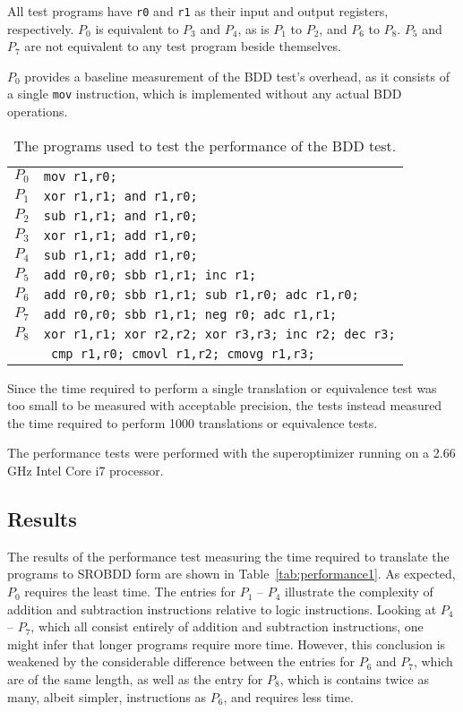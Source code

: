 \documentclass[a4paper,11pt]{kth-mag}
\begin{document}
All test programs have \verb|r0| and \verb|r1| as their input and output registers, respectively.
$P_0$ is equivalent to $P_3$ and $P_4$, as is $P_1$ to $P_2$, and $P_6$ to $P_8$.
$P_5$ and $P_7$ are not equivalent to any test program beside themselves.

$P_0$ provides a baseline measurement of the BDD test's overhead, as it consists of a single \verb|mov| instruction, which is implemented without any actual BDD operations.

\begin{table}
\centering
\begin{tabular}{l|l}
$P_0$ & \verb|mov r1,r0;| \\
$P_1$ & \verb|xor r1,r1; and r1,r0;| \\
$P_2$ & \verb|sub r1,r1; and r1,r0;| \\
$P_3$ & \verb|xor r1,r1; add r1,r0;| \\
$P_4$ & \verb|sub r1,r1; add r1,r0;| \\
$P_5$ & \verb|add r0,r0; sbb r1,r1; inc r1;| \\
$P_6$ & \verb|add r0,r0; sbb r1,r1; sub r1,r0; adc r1,r0;| \\
$P_7$ & \verb|add r0,r0; sbb r1,r1; neg r0; adc r1,r1;| \\
$P_8$ & \verb|xor r1,r1; xor r2,r2; xor r3,r3; inc r2; dec r3;|\\
      & \verb| cmp r1,r0; cmovl r1,r2; cmovg r1,r3;| \\
\end{tabular}
\caption{The programs used to test the performance of the BDD test.}
\label{tab:test_programs}
\end{table}

Since the time required to perform a single translation or equivalence test was too small to be measured with acceptable precision,
the tests instead measured the time required to perform 1000 translations or equivalence tests.

The performance tests were performed with the superoptimizer running on a 2.66 GHz Intel Core i7 processor.


\subsection{Results}

The results of the performance test measuring the time required to translate the programs to SROBDD form are shown in Table~\ref{tab:performance1}.
As expected, $P_0$ requires the least time.
The entries for $P_1$ -- $P_4$ illustrate the complexity of addition and subtraction instructions relative to logic instructions.
Looking at $P_4$ -- $P_7$, which all consist entirely of addition and subtraction instructions, one might infer that longer programs require more time.
However, this conclusion is weakened by the considerable difference between the entries for $P_6$ and $P_7$, which are of the same length,
as well as the entry for $P_8$, which is contains twice as many, albeit simpler, instructions as $P_6$, and requires less time.
\end{document}
